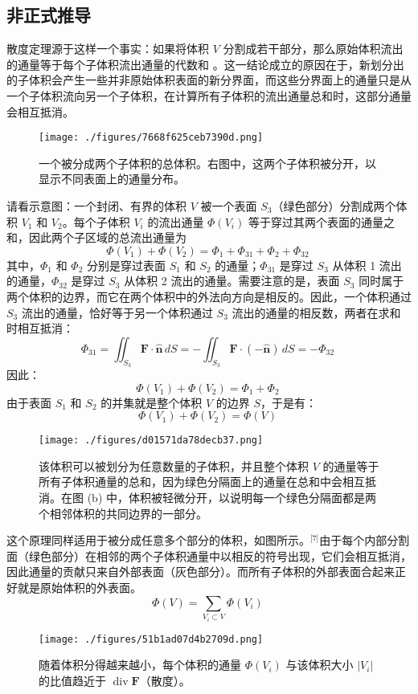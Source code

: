 \subsection{非正式推导}
散度定理源于这样一个事实：如果将体积 $V$ 分割成若干部分，那么原始体积流出的通量等于每个子体积流出通量的代数和  。这一结论成立的原因在于，新划分出的子体积会产生一些并非原始体积表面的新分界面，而这些分界面上的通量只是从一个子体积流向另一个子体积，在计算所有子体积的流出通量总和时，这部分通量会相互抵消。
\begin{figure}[ht]
\centering
\texttt{[image: ./figures/7668f625ceb7390d.png]}
\caption{一个被分成两个子体积的总体积。右图中，这两个子体积被分开，以显示不同表面上的通量分布。} \label{fig_GSsd_2}
\end{figure}
请看示意图：一个封闭、有界的体积 $V$ 被一个表面 $S_3$（绿色部分）分割成两个体积 $V_1$ 和 $V_2$。每个子体积 $V_i$ 的流出通量 $\Phi(V_i)$ 等于穿过其两个表面的通量之和，因此两个子区域的总流出通量为
$$
\Phi(V_1) + \Phi(V_2) = \Phi_1 + \Phi_{31} + \Phi_2 + \Phi_{32}~
$$
其中，$\Phi_1$ 和 $\Phi_2$ 分别是穿过表面 $S_1$ 和 $S_2$ 的通量；$\Phi_{31}$ 是穿过 $S_3$ 从体积 1 流出的通量，$\Phi_{32}$ 是穿过 $S_3$ 从体积 2 流出的通量。需要注意的是，表面 $S_3$ 同时属于两个体积的边界，而它在两个体积中的外法向方向是相反的。因此，一个体积通过 $S_3$ 流出的通量，恰好等于另一个体积通过 $S_3$ 流出的通量的相反数，两者在求和时相互抵消：
$$
\Phi_{31} = \iint_{S_3} \mathbf{F} \cdot \mathbf{\hat{n}}\, dS
          = -\iint_{S_3} \mathbf{F} \cdot (-\mathbf{\hat{n}})\, dS
          = -\Phi_{32}~
$$
因此：
$$
\Phi(V_1) + \Phi(V_2) = \Phi_1 + \Phi_2~
$$
由于表面 $S_1$ 和 $S_2$ 的并集就是整个体积 $V$ 的边界 $S$，于是有：
$$
\Phi(V_1) + \Phi(V_2) = \Phi(V)~
$$
\begin{figure}[ht]
\centering
\texttt{[image: ./figures/d01571da78decb37.png]}
\caption{该体积可以被划分为任意数量的子体积，并且整个体积 $V$ 的通量等于所有子体积通量的总和，因为绿色分隔面上的通量在总和中会相互抵消。在图 (b) 中，体积被轻微分开，以说明每一个绿色分隔面都是两个相邻体积的共同边界的一部分。} \label{fig_GSsd_3}
\end{figure}
这个原理同样适用于被分成任意多个部分的体积，如图所示。\(^\text{[7]}\)由于每个内部分割面（绿色部分）在相邻的两个子体积通量中以相反的符号出现，它们会相互抵消，因此通量的贡献只来自外部表面（灰色部分）。而所有子体积的外部表面合起来正好就是原始体积的外表面。
$$
\Phi(V) = \sum_{V_i \subset V} \Phi(V_i)~
$$
\begin{figure}[ht]
\centering
\texttt{[image: ./figures/51b1ad07d4b2709d.png]}
\caption{随着体积分得越来越小，每个体积的通量 $\Phi(V_i)$ 与该体积大小 $|V_i|$ 的比值趋近于 $\operatorname{div} \mathbf{F}$（散度）。} \label{fig_GSsd_4}
\end{figure}
